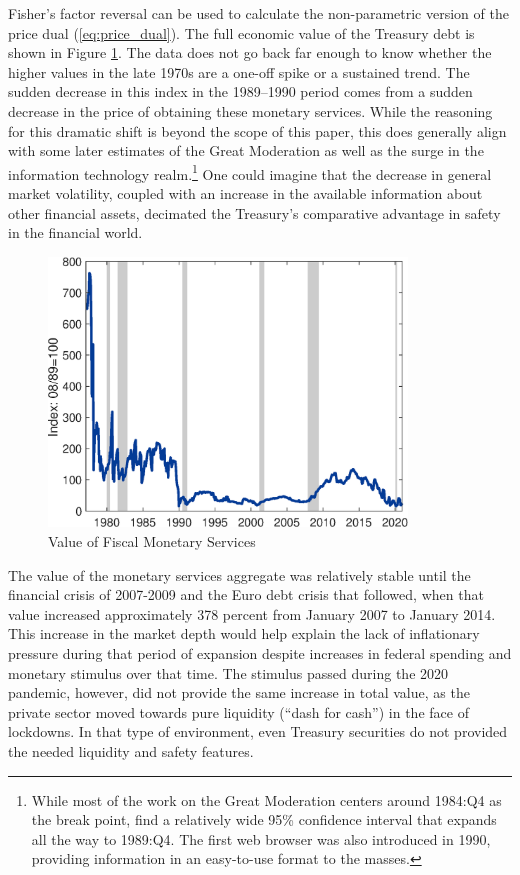 \documentclass[11pt,a4paper,margin=1.5in]{article}
\begin{document}
Fisher's factor reversal can be used to calculate the non-parametric version of the price dual (\ref{eq:price_dual}).
The full economic value of the Treasury debt is shown in Figure \ref{fig:FiscalServices_Value}.
The data does not go back far enough to know whether the higher values in the late 1970s are a one-off spike or a sustained trend. 
The sudden decrease in this index in the 1989--1990 period comes from a sudden decrease in the price of obtaining these monetary services.
While the reasoning for this dramatic shift is beyond the scope of this paper, this does generally align with some later estimates of the Great Moderation as well as the surge in the information technology realm.\footnote{
	While most of the work on the Great Moderation centers around 1984:Q4 as the break point, \citet{Stock-Watson:2002} find a relatively wide 95\% confidence interval that expands all the way to 1989:Q4.
	The first web browser was also introduced in 1990, providing information in an easy-to-use format to the masses.}
One could imagine that the decrease in general market volatility, coupled with an increase in the available information about other financial assets, decimated the Treasury's comparative advantage in safety in the financial world.
\begin{figure}[h!]
\centering
\includegraphics[width=0.85\textwidth]{../Figures/FiscalCapacity_Index.eps}
\caption{Value of Fiscal Monetary Services}
\label{fig:FiscalServices_Value}
\end{figure}

The value of the monetary services aggregate was relatively stable until the financial crisis of 2007-2009 and the Euro debt crisis that followed, when that value increased approximately 378 percent from January 2007 to January 2014. 
This increase in the market depth would help explain the lack of inflationary pressure during that period of expansion despite increases in federal spending and monetary stimulus over that time.
The stimulus passed during the 2020 pandemic, however, did not provide the same increase in total value, as the private sector moved towards pure liquidity (``dash for cash'') in the face of lockdowns.
In that type of environment, even Treasury securities do not provided the needed liquidity and safety features.
\end{document}
